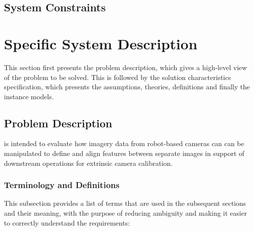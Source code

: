 \documentclass[12pt]{article}
\begin{document}
\subsection{System Constraints}


\section{Specific System Description}
This section first presents the problem description, which gives a high-level
view of the problem to be solved.  This is followed by the solution characteristics
specification, which presents the assumptions, theories, definitions and finally
the instance models. 

\subsection{Problem Description} \label{Sec_pd}

\progname{} is intended to evaluate how imagery data from robot-based cameras can 
can be manipulated to define and align features between separate images in support 
of downstream operations for extrinsic camera calibration.

\subsubsection{Terminology and  Definitions}

This subsection provides a list of terms that are used in the subsequent
sections and their meaning, with the purpose of reducing ambiguity and making it
easier to correctly understand the requirements:
\end{document}
